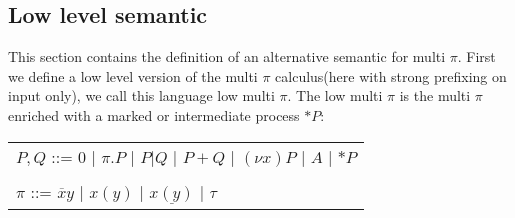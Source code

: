 \subsection{Low level semantic}
This section contains the definition of an alternative semantic for multi $\pi$. First we define a low level version of the multi $\pi$ calculus(here with strong prefixing on input only), we call this language low multi $\pi$. The low multi $\pi$ is the multi $\pi$ enriched with a marked or intermediate process $*P$:
\begin{center}
   \begin{tabular}{l}
     $P,Q$ ::= $0$ | $\pi.P$ | $P|Q$ | $P+Q$ | $(\nu x) P$ | $A$ | $*P$
   \\\\
     $\pi$ ::= $\overline{x}y$ | $x(y)$ | $\underline{x(y)}$ | $\tau$ 
   \end{tabular}
\end{center}
